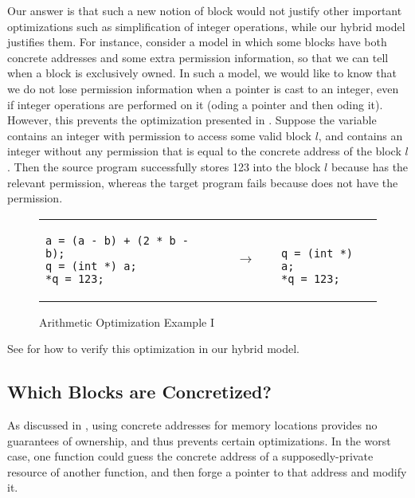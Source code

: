 Our answer is that such a new notion of block would not justify other important optimizations such
as simplification of integer operations, while our hybrid model justifies them.  For instance,
consider a model in which some blocks have both concrete addresses and some extra permission
information, so that we can tell when a block is exclusively owned. In such a model, we would like
to know that we do not lose permission information when a pointer is cast to an integer, even if
integer operations are performed on it (\eg {}oding a pointer and then
oding it).  However, this prevents the optimization presented in
.  Suppose the variable  contains an integer
with permission to access some valid block $l$, and  contains an integer without any
permission that is equal to the concrete address of the block $l$. Then the source program
successfully stores 123 into the block $l$ because  has the relevant permission, whereas the
target program fails because  does not have the permission.
%
\begin{figure}[t]
\center
\begin{tabular}{lll}
\begin{minipage}{0.4\textwidth}
\begin{verbatim}
a = (a - b) + (2 * b - b);
q = (int *) a;
*q = 123;
\end{verbatim}
\end{minipage}
&
$\quad\rightarrow\quad$
&
\begin{minipage}{0.2\textwidth}
\begin{verbatim}

q = (int *) a;
*q = 123;
\end{verbatim}
\end{minipage}
\end{tabular}
\caption{Arithmetic Optimization Example I}\label{fig:intptrcast:formal-semantics:arith1}
\end{figure}
%
See  for how to verify this optimization in our hybrid model.

\subsection{Which Blocks are Concretized?}
\label{sec:intptrcast:formal-semantics:cast}

As discussed in , using concrete addresses for memory locations provides
no guarantees of ownership, and thus prevents certain optimizations. In the worst case, one function
could guess the concrete address of a supposedly-private resource of another function, and then
forge a pointer to that address and modify it.

